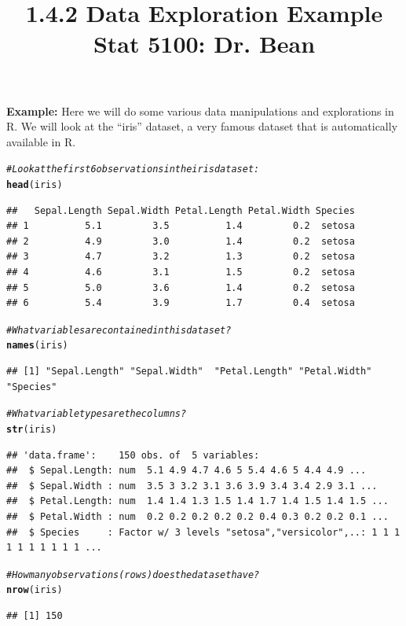 \documentclass{article}\usepackage[]{graphicx}\usepackage[]{color}
\makeatletter
\newcommand{\hlcom}[1]{\textcolor[rgb]{0.678,0.584,0.686}{\textit{#1}}}%
\newcommand{\hlstd}[1]{\textcolor[rgb]{0.345,0.345,0.345}{#1}}%
\newcommand{\hlkwd}[1]{\textcolor[rgb]{0.737,0.353,0.396}{\textbf{#1}}}%
\newenvironment{kframe}{%
 \def\at@end@of@kframe{}%
 \ifinner\ifhmode%
  \def\at@end@of@kframe{\end{minipage}}%
  \begin{minipage}{\columnwidth}%
 \fi\fi%
 \def\FrameCommand##1{\hskip\@totalleftmargin \hskip-\fboxsep
 \colorbox{shadecolor}{##1}\hskip-\fboxsep
     \hskip-\linewidth \hskip-\@totalleftmargin \hskip\columnwidth}%
 \MakeFramed {\advance\hsize-\width
   \@totalleftmargin\z@ \linewidth\hsize
   \@setminipage}}%
 {\par\unskip\endMakeFramed%
 \at@end@of@kframe}
\newenvironment{knitrout}{}{} %
\makeatother
\begin{document}

\title{%
  1.4.2 Data Exploration Example \\
  \smallskip
  \large Stat 5100: Dr. Bean
}
\date{}

\maketitle

\textbf{Example:} Here we will do some various data manipulations and explorations in R. We will look at the ``iris'' dataset, a very famous dataset that is automatically available in R.

\begin{knitrout}
\color{fgcolor}\begin{kframe}
\begin{alltt}
\hlcom{# Look at the first 6 observations in the iris dataset:}
\hlkwd{head}\hlstd{(iris)}
\end{alltt}
\begin{verbatim}
##   Sepal.Length Sepal.Width Petal.Length Petal.Width Species
## 1          5.1         3.5          1.4         0.2  setosa
## 2          4.9         3.0          1.4         0.2  setosa
## 3          4.7         3.2          1.3         0.2  setosa
## 4          4.6         3.1          1.5         0.2  setosa
## 5          5.0         3.6          1.4         0.2  setosa
## 6          5.4         3.9          1.7         0.4  setosa
\end{verbatim}
\begin{alltt}
\hlcom{# What variables are contained in this dataset?}
\hlkwd{names}\hlstd{(iris)}
\end{alltt}
\begin{verbatim}
## [1] "Sepal.Length" "Sepal.Width"  "Petal.Length" "Petal.Width"  "Species"
\end{verbatim}
\begin{alltt}
\hlcom{# What variable types are the columns?}
\hlkwd{str}\hlstd{(iris)}
\end{alltt}
\begin{verbatim}
## 'data.frame':	150 obs. of  5 variables:
##  $ Sepal.Length: num  5.1 4.9 4.7 4.6 5 5.4 4.6 5 4.4 4.9 ...
##  $ Sepal.Width : num  3.5 3 3.2 3.1 3.6 3.9 3.4 3.4 2.9 3.1 ...
##  $ Petal.Length: num  1.4 1.4 1.3 1.5 1.4 1.7 1.4 1.5 1.4 1.5 ...
##  $ Petal.Width : num  0.2 0.2 0.2 0.2 0.2 0.4 0.3 0.2 0.2 0.1 ...
##  $ Species     : Factor w/ 3 levels "setosa","versicolor",..: 1 1 1 1 1 1 1 1 1 1 ...
\end{verbatim}
\begin{alltt}
\hlcom{# How many observations (rows) does the dataset have?}
\hlkwd{nrow}\hlstd{(iris)}
\end{alltt}
\begin{verbatim}
## [1] 150
\end{verbatim}
\end{kframe}
\end{knitrout}
\end{document}
